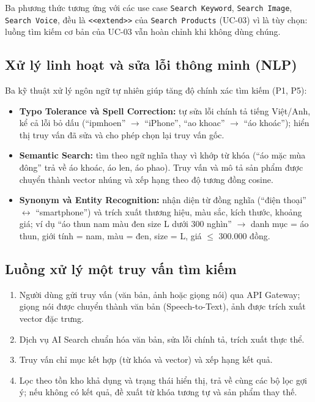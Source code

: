 \documentclass[12pt,a4paper,oneside]{report}
\begin{document}
Ba phương thức tương ứng với các use case \texttt{Search Keyword}, \texttt{Search Image}, \texttt{Search Voice}, đều là \texttt{<<extend>>} của \texttt{Search Products} (UC-03) vì là tùy chọn: luồng tìm kiếm cơ bản của UC-03 vẫn hoàn chỉnh khi không dùng chúng.

\subsection{Xử lý linh hoạt và sửa lỗi thông minh (NLP)}

Ba kỹ thuật xử lý ngôn ngữ tự nhiên giúp tăng độ chính xác tìm kiếm (P1, P5):

\begin{itemize}
  \item \textbf{Typo Tolerance và Spell Correction:} tự sửa lỗi chính tả tiếng Việt/Anh, kể cả lỗi bỏ dấu (``ipmhoen'' $\rightarrow$ ``iPhone'', ``ao khoac'' $\rightarrow$ ``áo khoác''); hiển thị truy vấn đã sửa và cho phép chọn lại truy vấn gốc.
  \item \textbf{Semantic Search:} tìm theo ngữ nghĩa thay vì khớp từ khóa (``áo mặc mùa đông'' trả về áo khoác, áo len, áo phao). Truy vấn và mô tả sản phẩm được chuyển thành vector nhúng và xếp hạng theo độ tương đồng cosine.
  \item \textbf{Synonym và Entity Recognition:} nhận diện từ đồng nghĩa (``điện thoại'' $\leftrightarrow$ ``smartphone'') và trích xuất thương hiệu, màu sắc, kích thước, khoảng giá; ví dụ ``áo thun nam màu đen size L dưới 300 nghìn'' $\rightarrow$ danh mục = áo thun, giới tính = nam, màu = đen, size = L, giá $\leq$ 300.000 đồng.
\end{itemize}

\subsection{Luồng xử lý một truy vấn tìm kiếm}

\begin{enumerate}
  \item Người dùng gửi truy vấn (văn bản, ảnh hoặc giọng nói) qua API Gateway; giọng nói được chuyển thành văn bản (Speech-to-Text), ảnh được trích xuất vector đặc trưng.
  \item Dịch vụ AI Search chuẩn hóa văn bản, sửa lỗi chính tả, trích xuất thực thể.
  \item Truy vấn chỉ mục kết hợp (từ khóa và vector) và xếp hạng kết quả.
  \item Lọc theo tồn kho khả dụng và trạng thái hiển thị, trả về cùng các bộ lọc gợi ý; nếu không có kết quả, đề xuất từ khóa tương tự và sản phẩm thay thế.
\end{enumerate}
\end{document}
